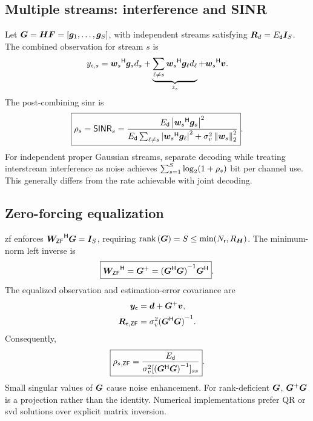 \subsection{Multiple streams: interference and SINR}
Let $\bm{G}=\bm{H}\bm{F}=[\bm{g}_1,\ldots,\bm{g}_{S}]$,
with independent streams satisfying $\bm{R}_d=E_{\mathsf{d}}\bm{I}_{S}$.
The combined observation for stream $s$ is
\begin{equation*}
	y_{\mathsf c,s}
	={\bm{w}_s}^{\mathsf{H}}\bm{g}_s d_s
	+\underbrace{\sum_{\ell\ne s}
		{\bm{w}_s}^{\mathsf{H}}\bm{g}_{\ell}d_{\ell}}_{z_s}
	+{\bm{w}_s}^{\mathsf{H}}\bm{v}.
\end{equation*}
The post-combining \ac{sinr} is
\begin{equation}\label{eq:sinr}
	\boxed{\rho_s = \mathsf{SINR}_s=
		\frac{E_{\mathsf{d}}\left|{\bm{w}_s}^{\mathsf{H}}\bm{g}_s\right|^2}
		{E_{\mathsf{d}}\sum_{\ell\ne s}
			\left|{\bm{w}_s}^{\mathsf{H}}\bm{g}_{\ell}\right|^2
			+\sigma_v^2\left\|\bm{w}_s\right\|_2^2}}.
\end{equation}
For independent proper Gaussian streams, separate decoding while
treating interstream interference as noise achieves
$\sum_{s=1}^{S}\log_2(1+\rho_s)$ bit per channel use.
This generally differs from the rate achievable with joint decoding.

\subsection{Zero-forcing equalization}
\ac{zf} enforces ${\bm{W}_{\mathsf{ZF}}}^{\mathsf{H}}\bm{G}=\bm{I}_{S}$,
requiring $\operatorname{rank}\left(\bm{G}\right)=S\leq\min(N_{\mathsf{r}},R_{\bm{H}})$.
The minimum-norm left inverse is
\begin{equation}\label{eq:zf}
	\boxed{{\bm{W}_{\mathsf{ZF}}}^{\mathsf{H}}={\bm{G}}^{+}
		={({\bm{G}}^{\mathsf{H}}\bm{G})}^{-1}{\bm{G}}^{\mathsf{H}}}.
\end{equation}
The equalized observation and estimation-error covariance are
\begin{align*}
	\bm{y}_{\mathsf c}&=\bm{d}+{\bm{G}}^{+}\bm{v},\\
	\bm{R}_{\mathsf e,\mathsf{ZF}}
	&=\sigma_v^2{({\bm{G}}^{\mathsf{H}}\bm{G})}^{-1}.
\end{align*}
Consequently,
\begin{equation}\label{eq:zfnoise}
	\boxed{\rho_{s,\mathsf{ZF}}=
		\frac{E_{\mathsf{d}}}{\sigma_v^2
			[{({\bm{G}}^{\mathsf{H}}\bm{G})}^{-1}]_{ss}}}.
\end{equation}
Small singular values of $\bm{G}$ cause noise enhancement.
For rank-deficient $\bm{G}$, ${\bm{G}}^{+}\bm{G}$ is a
projection rather than the identity. Numerical implementations
prefer QR or \ac{svd} solutions over explicit matrix inversion.

